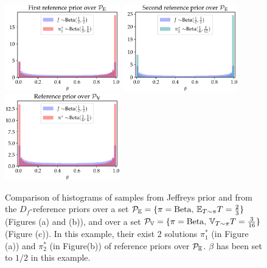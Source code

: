 \begin{figure}
    \centering%
    \includegraphics[width=5cm]{figures/generalized-ref/firstPe.pdf}\hspace*{0.5cm}%
    \includegraphics[width=5cm]{figures/generalized-ref/secondPe.pdf}\hspace*{0.5cm}%
    \includegraphics[width=5cm]{figures/generalized-ref/Pv.pdf}\\
    \caption{Comparison of histograms of samples from Jeffreys prior and from the $D_f$-reference priors over a set $\mathcal{P}_{\mathbb{E}}=\{\pi=\mathrm{Beta},\,\mathbb{E}_{T\sim\pi}T=\frac{2}{3}\}$ (Figures (a) and (b)), and over a set $\mathcal{P}_{\mathbb{V}}=\{\pi=\mathrm{Beta},\,\mathbb{V}_{T\sim\pi}T=\frac{3}{16}\}$ (Figure (c)). In this example, their exist 2 solutions $\pi_1^\ast$ (in Figure (a)) and $\pi_2^\ast$ (in Figure(b)) of reference priors over $\mathcal{P}_{\mathbb{E}}$. $\beta$ has been set to $1/2$ in this example.}
    \label{fig:exbeta}
\end{figure}





